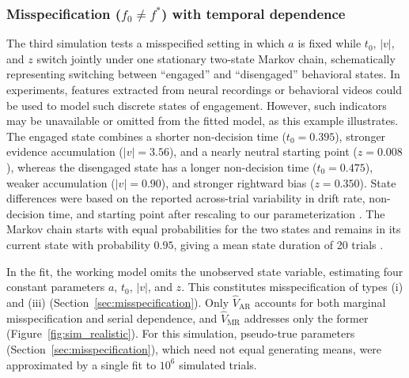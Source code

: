 \documentclass[00-main.tex]{subfiles}
\begin{document}
\subsubsection{Misspecification ($f_0 \neq f^*$) with temporal dependence}
The third simulation tests a misspecified setting in which $a$ is fixed while $t_0$, $|v|$, and $z$ switch jointly under one stationary two-state Markov chain, schematically representing switching between ``engaged'' and ``disengaged'' behavioral states. In experiments, features extracted from neural recordings or behavioral videos could be used to model such discrete states of engagement. However, such indicators may be unavailable or omitted from the fitted model, as this example illustrates. The engaged state combines a shorter non-decision time ($t_0=0.395$), stronger evidence accumulation ($|v|=3.56$), and a nearly neutral starting point ($z=0.008$), whereas the disengaged state has a longer non-decision time ($t_0=0.475$), weaker accumulation ($|v|=0.90$), and stronger rightward bias ($z=0.350$). State differences were based on the reported across-trial variability in drift rate, non-decision time, and starting point after rescaling to our parameterization \citep{matzke_psychological_2009}.  The Markov chain starts with equal probabilities for the two states and remains in its current state with probability $0.95$, giving a mean state duration of 20 trials \citep{ashwood_mice_2022}.

In the fit, the working model omits the unobserved state variable, estimating four constant parameters $a$, $t_0$, $|v|$, and $z$. This constitutes misspecification of types (i) and (iii) (Section~\ref{sec:misspecification}).  Only $\widehat{V}_\text{AR}$ accounts for both marginal misspecification and serial dependence, and $\widehat{V}_\text{MR}$ addresses only the former (Figure~\ref{fig:sim_realistic}).  For this simulation, pseudo-true parameters (Section~\ref{sec:misspecification}), which need not equal generating means, were approximated by a single fit to $10^6$ simulated trials.
\end{document}
